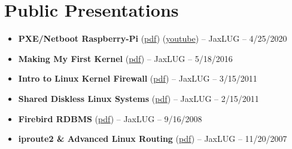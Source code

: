 \documentclass[10pt]{report}
\begin{document}
\section*{Public Presentations}
\begin{itemize}
  \item \textbf{PXE/Netboot Raspberry-Pi} (\href{https://obsidian-studios.com/~wlt/presentations/2020-04-15_jaxlug_pxe_network_booting_raspberry_pis.pdf}{pdf}) (\href{https://www.youtube.com/watch?v=kT5jlbRNgcE}{youtube}) – JaxLUG – 4/25/2020
  \item \textbf{Making My First Kernel} (\href{https://obsidian-studios.com/~wlt/presentations/2016-05-18_jaxlug_making_my_first_kernel.pdf}{pdf}) – JaxLUG – 5/18/2016
  \item \textbf{Intro to Linux Kernel Firewall} (\href{http://www.obsidian-studios.com/~wlt/presentations/2011-03-15_jaxlug_intro_to_linux_kernel_firewall.pdf}{pdf}) – JaxLUG – 3/15/2011
  \item \textbf{Shared Diskless Linux Systems} (\href{http://www.obsidian-studios.com/~wlt/presentations/2011-02-15_jaxlug_shared_diskless_linux_systems.pdf}{pdf}) – JaxLUG – 2/15/2011
  \item \textbf{Firebird RDBMS} (\href{http://www.obsidian-studios.com/~wlt/presentations/2008_09_16_jaxlug_firebird_rdbms.pdf}{pdf}) – JaxLUG – 9/16/2008
  \item \textbf{iproute2 \& Advanced Linux Routing} (\href{http://www.obsidian-studios.com/~wlt/presentations/2007_11_20_jaxlug_iproute2_\&_advanced_linux_routing.pdf}{pdf}) – JaxLUG – 11/20/2007
\end{itemize}
\end{document}
